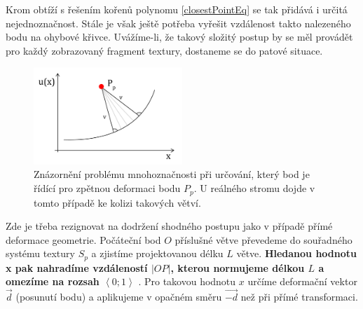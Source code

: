 Krom obtíží s řešením kořenů polynomu \eqref{closestPointEq} se tak přidává i určitá nejednoznačnost. Stále je však ještě potřeba vyřešit vzdálenost takto nalezeného bodu na ohybové křivce. Uvážíme-li, že takový složitý postup by se měl provádět pro každý zobrazovaný fragment textury, dostaneme se do patové situace.
\begin{figure}[here]%
\begin{center}
\includegraphics[width=0.5\textwidth]{./figures/revDef_multisolution.png}
\caption[Mnohoznačnost při zpětné transformaci]
{Znázornění problému mnohoznačnosti při určování, který bod je řídící pro zpětnou deformaci bodu $P_p$. U reálného stromu dojde v tomto případě ke kolizi takových větví.\label{fig:multisolution}}
\end{center}
\end{figure}
Zde je třeba rezignovat na dodržení shodného postupu jako v případě přímé deformace geometrie. Počáteční bod $O$ příslušné větve převedeme do souřadného systému textury ${S_p}$ a zjistíme projektovanou délku $L$ větve. {\bf Hledanou hodnotu x pak nahradíme vzdáleností $\left| OP \right|$, kterou normujeme délkou $L $ a omezíme na rozsah $\left \langle 0;1 \right \rangle$ }. Pro takovou hodnotu $x$ určíme deformační vektor $\vec{d}$ (posunutí bodu) a aplikujeme v opačném směru $\vec{-d}$ než při přímé transformaci.
 
